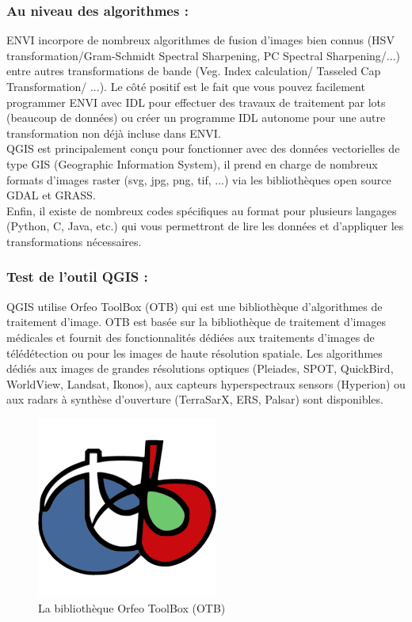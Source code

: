 \documentclass[12pt, openany]{report}
\begin{document}
\subsubsection{Au niveau des algorithmes :}


ENVI incorpore de nombreux algorithmes de fusion d'images bien connus (HSV transformation/Gram-Schmidt Spectral Sharpening, PC Spectral Sharpening/...) entre autres transformations de bande (Veg. Index calculation/ Tasseled Cap Transformation/ ...). Le côté positif est le fait que vous pouvez facilement programmer ENVI avec IDL pour effectuer des travaux de traitement par lots (beaucoup de données) ou créer un programme IDL autonome pour une autre transformation non déjà incluse dans ENVI.\\

QGIS est principalement conçu pour fonctionner avec des données vectorielles de type GIS (Geographic Information System), il prend en charge de nombreux formats d'images raster (svg, jpg, png, tif, ...) via les bibliothèques open source GDAL et GRASS.\\

Enfin, il existe de nombreux codes spécifiques au format pour plusieurs langages (Python, C, Java, etc.) qui vous permettront de lire les données et d'appliquer les transformations nécessaires.\\

\subsubsection{Test de l'outil QGIS :}
QGIS utilise Orfeo ToolBox (OTB) qui est une bibliothèque d’algorithmes de traitement d’image. OTB est basée sur la bibliothèque de traitement d’images médicales et fournit des fonctionnalités dédiées aux traitements d’images de télédétection ou pour les images de haute résolution spatiale. Les algorithmes dédiés aux images de grandes résolutions optiques (Pleiades, SPOT, QuickBird, WorldView, Landsat, Ikonos), aux capteurs hyperspectraux sensors (Hyperion) ou aux radars à synthèse d’ouverture (TerraSarX, ERS, Palsar) sont disponibles.
\begin{figure}[ht]
\centering
\includegraphics[scale=0.5]{orfeo.png}
\caption{La bibliothèque Orfeo ToolBox (OTB)}
\end{figure}
\end{document}
